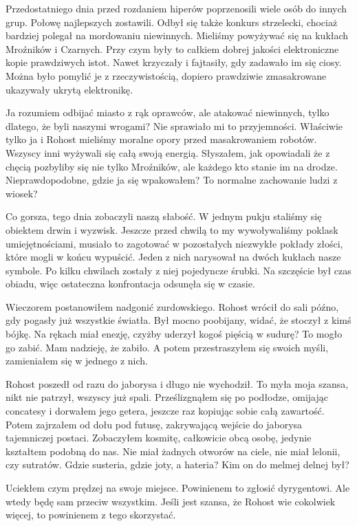 Przedostatniego dnia przed rozdaniem hiperów poprzenosili wiele osób do innych grup.
Połowę najlepszych zostawili.
Odbył się także konkurs strzelecki, chociaż bardziej polegał na mordowaniu niewinnych.
Mieliśmy powyżywać się na kukłach Mroźników i Czarnych.
Przy czym były to całkiem dobrej jakości elektroniczne kopie prawdziwych istot.
Nawet krzyczały i fajtasiły, gdy zadawało im się ciosy.
Można było pomylić je z rzeczywistością, dopiero prawdziwie zmasakrowane ukazywały ukrytą elektronikę.

Ja rozumiem odbijać miasto z rąk oprawców, ale atakować niewinnych, tylko dlatego, że byli naszymi wrogami?
Nie sprawiało mi to przyjemności.
Właściwie tylko ja i Rohost mieliśmy moralne opory przed masakrowaniem robotów.
Wszyscy inni wyżywali się całą swoją energią.
Słyszałem, jak opowiadali że z chęcią pozbyliby się nie tylko Mroźników, ale każdego kto stanie im na drodze. 
Nieprawdopodobne, gdzie ja się wpakowałem? To normalne zachowanie ludzi z wiosek?

Co gorsza, tego dnia zobaczyli naszą słabość.
W jednym pukju staliśmy się obiektem drwin i wyzwisk.
Jeszcze przed chwilą to my wywoływaliśmy poklask umiejętnościami, musiało to zagotować w pozostałych niezwykłe pokłady złości, które mogli w końcu wypuścić.
Jeden z nich narysował na dwóch kukłach nasze symbole. Po kilku chwilach zostały z niej pojedyncze śrubki.
Na szczęście był czas obiadu, więc ostateczna konfrontacja odsunęła się w czasie.

Wieczorem postanowiłem nadgonić zurdowskiego.
Rohost wrócił do sali późno, gdy pogasły już wszystkie światła.
Był mocno poobijany, widać, że stoczył z kimś bójkę. Na rękach miał enezję, czyżby uderzył kogoś pięścią w sudurę? To mogło go zabić. Mam nadzieję, że zabiło.
A potem przestraszyłem się swoich myśli, zamieniałem się w jednego z nich.

Rohost poszedł od razu do jaborysa i długo nie wychodził.
To myła moja szansa, nikt nie patrzył, wszyscy już spali.
Prześlizgnąłem się po podłodze, omijając concatesy i dorwałem jego getera, jeszcze raz kopiując sobie całą zawartość.
Potem zajrzałem od dołu pod futusę, zakrywającą wejście do jaborysa tajemniczej postaci.
Zobaczyłem kosmitę, całkowicie obcą osobę, jedynie kształtem podobną do nas.
Nie miał żadnych otworów na ciele, nie miał lelonii, czy sutratów.
Gdzie susteria, gdzie joty, a hateria?
Kim on do melmej delnej był?

Uciekłem czym prędzej na swoje miejsce.
Powinienem to zgłosić dyrygentowi.
Ale wtedy będę sam przeciw wszystkim.
Jeśli jest szansa, że Rohost wie cokolwiek więcej, to powinienem z tego skorzystać.


